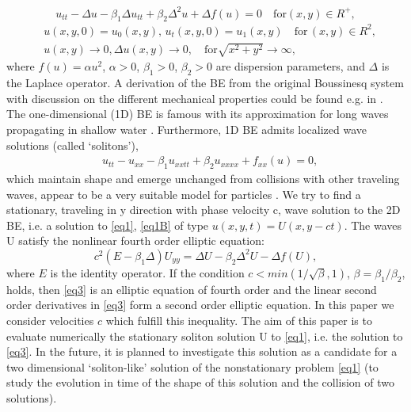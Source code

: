 \documentclass[12pt]{article}
\theoremstyle{theorem}
\theoremstyle{defi}
\begin{document}
\begin{equation}
u_{tt} - \Delta u -\beta_1  \Delta u_{tt} +\beta_2 \Delta ^2 u + \Delta f(u)=0 \quad \text{for} (x,y) \in R^{+} ,\label{eq1}
\end{equation}
\begin{equation}\label{eq1B}
\begin{split}
&u(x,y,0)=u_0(x,y), \, u_t(x,y,0)=u_1(x,y)   \quad\text{for} \, (x,y) \in R^2, \\
&u(x,y) \rightarrow 0,  \Delta u(x,y) \rightarrow 0 ,  \quad \text{for}  \sqrt{x^2 + y^2} \rightarrow \infty, 
\end{split}
\end{equation}
where   $f(u)=\alpha u^2$,  $\alpha>0$, $\beta_1>0$, $\beta_2>0$  are dispersion parameters, and $\Delta$ is the Laplace operator. A derivation of the BE from the original Boussinesq system with discussion on the different mechanical properties could be found e.g. in \cite{ref1}. 
The one-dimensional (1D) BE is famous with its approximation for long waves propagating in shallow water \cite{ref2, ref3}. Furthermore, 1D BE admits localized wave solutions (called ‘solitons’), 
\begin{align}
&u_{tt} - u_{xx} -\beta_1  u_{xxtt} +\beta_2 u_{xxxx} + f_{xx}(u) =0, \label{eq2}
\end{align}
which maintain shape and emerge unchanged from collisions with other traveling waves, appear to be a very suitable model for particles \cite{ref4, ref5}.
We try to find a stationary, traveling in y direction with phase velocity c, wave solution to the 2D BE, i.e. a solution to \ref{eq1}, \ref{eq1B} of type $u(x,y,t)=U(x,y - ct)$. The waves U satisfy the nonlinear fourth order elliptic equation:
\begin{equation}
c^2 (E-\beta_1 \Delta) U_{yy} = \Delta U -\beta_2 \Delta^2 U - \Delta f(U), \label{eq3}
\end{equation}
where $E$ is the identity operator. If the condition  $c<min(1/\sqrt{\beta}, 1)$, $\beta = \beta_1/\beta_2$,   holds, then \ref{eq3} is an elliptic equation of fourth order and the linear second order derivatives in \ref{eq3} form a second order elliptic equation. In this paper we consider velocities $c$ which fulfill this inequality.
 The aim of this paper is to evaluate numerically the stationary soliton solution U to \ref{eq1}, i.e. the solution to \ref{eq3}. In the future, it is planned to investigate this solution as a candidate for a two dimensional ‘soliton-like’ solution of the nonstationary problem \ref{eq1} (to study the evolution in time of the shape of this solution and the collision of two solutions).
\end{document}
